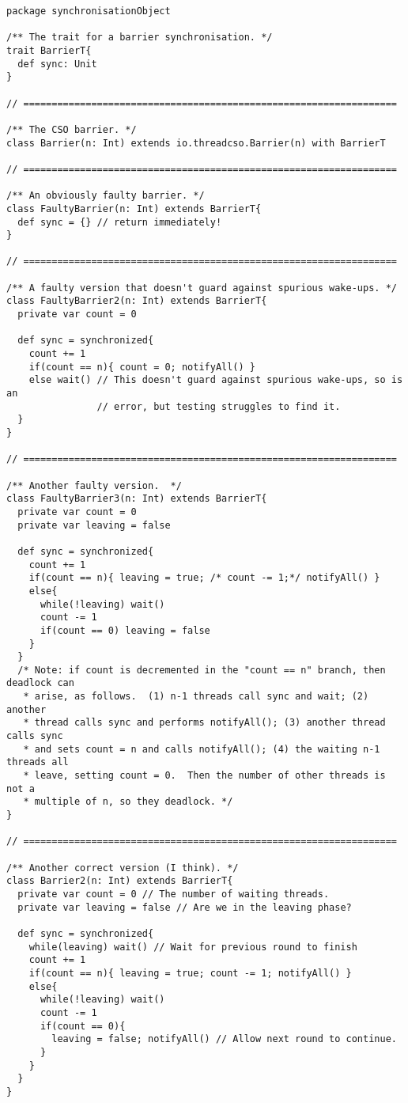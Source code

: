 \begin{lstlisting}
package synchronisationObject

/** The trait for a barrier synchronisation. */
trait BarrierT{
  def sync: Unit
}

// ==================================================================

/** The CSO barrier. */
class Barrier(n: Int) extends io.threadcso.Barrier(n) with BarrierT

// ==================================================================

/** An obviously faulty barrier. */
class FaultyBarrier(n: Int) extends BarrierT{
  def sync = {} // return immediately!
}

// ==================================================================

/** A faulty version that doesn't guard against spurious wake-ups. */
class FaultyBarrier2(n: Int) extends BarrierT{
  private var count = 0

  def sync = synchronized{
    count += 1
    if(count == n){ count = 0; notifyAll() }
    else wait() // This doesn't guard against spurious wake-ups, so is an
                // error, but testing struggles to find it.
  }
}

// ==================================================================

/** Another faulty version.  */
class FaultyBarrier3(n: Int) extends BarrierT{
  private var count = 0
  private var leaving = false

  def sync = synchronized{
    count += 1
    if(count == n){ leaving = true; /* count -= 1;*/ notifyAll() }
    else{ 
      while(!leaving) wait()
      count -= 1
      if(count == 0) leaving = false
    }
  }
  /* Note: if count is decremented in the "count == n" branch, then deadlock can
   * arise, as follows.  (1) n-1 threads call sync and wait; (2) another
   * thread calls sync and performs notifyAll(); (3) another thread calls sync
   * and sets count = n and calls notifyAll(); (4) the waiting n-1 threads all
   * leave, setting count = 0.  Then the number of other threads is not a
   * multiple of n, so they deadlock. */
} 

// ==================================================================

/** Another correct version (I think). */
class Barrier2(n: Int) extends BarrierT{
  private var count = 0 // The number of waiting threads.
  private var leaving = false // Are we in the leaving phase?

  def sync = synchronized{
    while(leaving) wait() // Wait for previous round to finish
    count += 1
    if(count == n){ leaving = true; count -= 1; notifyAll() }
    else{ 
      while(!leaving) wait()
      count -= 1
      if(count == 0){ 
        leaving = false; notifyAll() // Allow next round to continue. 
      }
    }
  }
}

\end{lstlisting}
